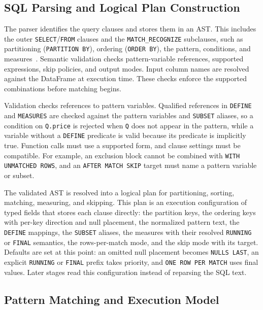 \documentclass[preprint,12pt,times,a4paper]{elsarticle}
\begin{document}
\subsection{SQL Parsing and Logical Plan Construction}

The parser identifies the query clauses and stores them in an AST. This
includes the outer \texttt{SELECT}/\texttt{FROM} clauses and the
\texttt{MATCH\_RECOGNIZE} subclauses, such as partitioning
(\texttt{PARTITION BY}), ordering (\texttt{ORDER BY}), the pattern,
conditions, and measures~\cite{antlr_trino_sql,parr2013definitive}.
Semantic validation checks pattern-variable references, supported expressions,
skip policies, and output modes. Input column names are resolved against the
DataFrame at execution time. These checks enforce the supported combinations
before matching begins.

Validation checks references to pattern variables. Qualified references in
\texttt{DEFINE} and \texttt{MEASURES} are checked against the pattern variables
and \texttt{SUBSET} aliases, so a condition on \texttt{Q.price} is rejected when
\texttt{Q} does not appear in the pattern, while a variable without a
\texttt{DEFINE} predicate is valid because its predicate is implicitly true.
Function calls must use a supported form, and clause settings must be
compatible. For example, an exclusion block cannot be combined with
\texttt{WITH UNMATCHED ROWS}, and an \texttt{AFTER MATCH SKIP} target must
name a pattern variable or subset.

The validated AST is resolved into a logical plan for partitioning, sorting,
matching, measuring, and skipping. This plan is an execution
configuration of typed fields that stores each clause directly: the
partition keys, the ordering keys with per-key direction and null placement, the
normalized pattern text, the \texttt{DEFINE} mappings, the \texttt{SUBSET}
aliases, the measures with their resolved \texttt{RUNNING} or \texttt{FINAL}
semantics, the rows-per-match mode, and the skip mode with its target. Defaults
are set at this point: an omitted null placement becomes \texttt{NULLS LAST},
an explicit \texttt{RUNNING} or \texttt{FINAL} prefix takes priority, and
\texttt{ONE ROW PER MATCH} uses final values. Later stages read this
configuration instead of reparsing the SQL text.

\subsection{Pattern Matching and Execution Model}
\end{document}
